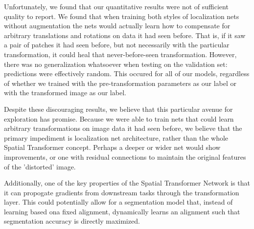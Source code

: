 Unfortunately, we found that our quantitative results were not of sufficient quality to report. We found that when training both styles of localization nets without augmentation the nets would actually learn how to compensate for arbitrary translations and rotations on data it had seen before. That is, if it saw a pair of patches it had seen before, but not necessarily with the particular transformation, it could heal that never-before-seen transformation. However, there was no generalization whatsoever when testing on the validation set: predictions were effectively random. This occured for all of our models, regardless of whether we trained with the pre-transformation parameters as our label or with the transformed image as our label.

Despite these discouraging results, we believe that this particular avenue for exploration has promise. Because we were able to train nets that could learn arbitrary transformations on image data it had seen before, we believe that the primary impediment is localization net architecture, rather than the whole Spatial Transformer concept. Perhaps a deeper or wider net would show improvements, or one with residual connections to maintain the original features of the 'distorted' image. 

Additionally, one of the key properties of the Spatial Transformer Network is that it can propogate gradients from downstream tasks through the transformation layer. This could potentially allow for a segmentation model that, instead of learning based ona fixed alignment, dynamically learns an alignment such that segmentation accuracy is directly maximized.